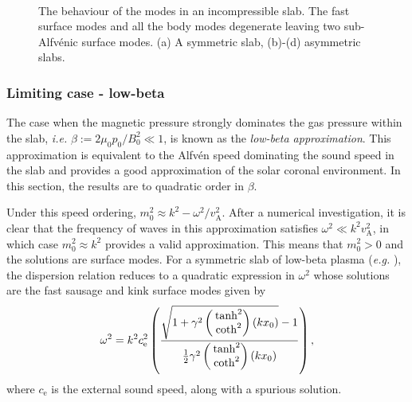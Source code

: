 \documentclass[12pt]{../style-files/ociamthesis}
\begin{document}
\begin{figure}
	\centering
	 \\
	\caption{The behaviour of the modes in an incompressible slab. The fast surface modes and all the body modes degenerate leaving two sub-Alfv\'{e}nic surface modes. (a) A symmetric slab, (b)-(d) asymmetric slabs.}
\end{figure}


\subsubsection{Limiting case - low-beta} \label{sec: zero-beta}

The case when the magnetic pressure strongly dominates the gas pressure within the slab, \textit{i.e.} $\beta := 2\mu_0{p_0}/B_0^2 \ll 1$, is known as the \textit{low-beta approximation}. This approximation is equivalent to the Alfv\'{e}n speed dominating the sound speed in the slab and provides a good approximation of the solar coronal environment. In this section, the results are to quadratic order in $\beta$.

Under this speed ordering, $m_0^2\approx{}k^2-\omega^2/v_\textrm{A}^2$. After a numerical investigation, it is clear that the frequency of waves in this approximation satisfies $\omega^2\ll{}k^2v_\textrm{A}^2$, in which case $m_0^2\approx k^2$ provides a valid approximation. This means that $m_0^2>0$ and the solutions are surface modes. For a symmetric slab of low-beta plasma (\textit{e.g.} \citealt{rob81b}), the dispersion relation reduces to a quadratic expression in $\omega^2$ whose solutions are the fast sausage and kink surface modes given by
\begin{equation}
\omega^2=k^2c_\textrm{e}^2\left(\frac{\sqrt{1+\gamma^2\left(\hspace{-0.11in}\begin{matrix}&\tanh^2 \\&\coth^2 \end{matrix}\right)(kx_0)}-1}{\frac{1}{2}\gamma^2\left(\hspace{-0.11in}\begin{matrix}&\tanh^2 \\&\coth^2 \end{matrix}\right)(kx_0)}\right),
\end{equation}
where $c_\textrm{e}$ is the external sound speed, along with a spurious solution.
\end{document}
